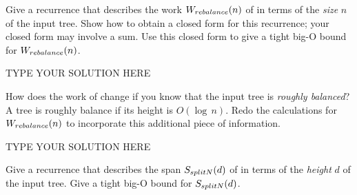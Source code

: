 \documentclass[11pt]{article}
\newcommand{\declarecommand}[1]{\providecommand{#1}{}\renewcommand{#1}}
\begin{document}
\declarecommand{\Wa}{W_{\smle!splitN!}}
\declarecommand{\Wb}{W_{\smle!leftmost!}}
\declarecommand{\Wc}{W_{\smle!halves!}}
\declarecommand{\Wd}{W_{\smle!rebalance!}}
\begin{task}{2} %
  Give a recurrence that describes the work $W_{\smle{rebalance}}(n)$ of
   in terms of the \emph{size} $n$ of the input tree.
  Show how to obtain a closed form for this recurrence; your closed form may
  involve a sum.  Use this closed form to give a tight big-O bound for
  $W_{\smle{rebalance}}(n)$.
\end{task}

\begin{solution}
TYPE YOUR SOLUTION HERE
\end{solution}


\declarecommand{\Wa}{W_{\smle!splitN!}}
\declarecommand{\Wb}{W_{\smle!leftmost!}}
\declarecommand{\Wc}{W_{\smle!halves!}}
\declarecommand{\Wd}{W_{\smle!rebalance!}}
\declarecommand{\Ka}{\makebox[2em]{\ensuremath{k_1+k_2n}}}
\declarecommand{\K}[1]{\makebox[1.5em]{\ensuremath{k_1+k_2\frac{n}{#1}}}}
\declarecommand{\Kl}[1]{\makebox[1.5em][l]{\ensuremath{k_1+k_2\frac{n}{#1}}}}
\declarecommand{\Kr}[1]{\makebox[1.5em][r]{\ensuremath{k_1+k_2\frac{n}{#1}}}}
\begin{task}{2} %
  How does the work of  change if you know that the input tree
  is \emph{roughly balanced}?  A tree is roughly balance if its height is
  $O(\log\,n)$.  Redo the calculations for $W_{\smle{rebalance}}(n)$ to
  incorporate this additional piece of information.
\end{task}

\begin{solution}
TYPE YOUR SOLUTION HERE
\end{solution}


\declarecommand{\Wa}{W_{\smle!splitN!}}
\declarecommand{\Wb}{W_{\smle!leftmost!}}
\declarecommand{\Wc}{W_{\smle!halves!}}
\declarecommand{\Wd}{W_{\smle!rebalance!}}
\declarecommand{\Ka}{\makebox[2em]{\ensuremath{k_1+k_2\log\,n}}}
\declarecommand{\K}[1]{\makebox[2.3em]{\ensuremath{k_1+k_2\log\frac{n}{#1}}}}
\declarecommand{\Kl}[1]{\makebox[1.5em][l]{\ensuremath{k_1+k_2\log\frac{n}{#1}}}}
\declarecommand{\Kr}[1]{\makebox[1.5em][r]{\ensuremath{k_1+k_2\log\frac{n}{#1}}}}
\begin{task}{2} %
  Give a recurrence that describes the span $S_{\smle{splitN}}(d)$ of
   in terms of the \emph{height} $d$ of the input tree.  Give a
  tight big-O bound for $S_{\smle{splitN}}(d)$.
\end{task}
\end{document}
